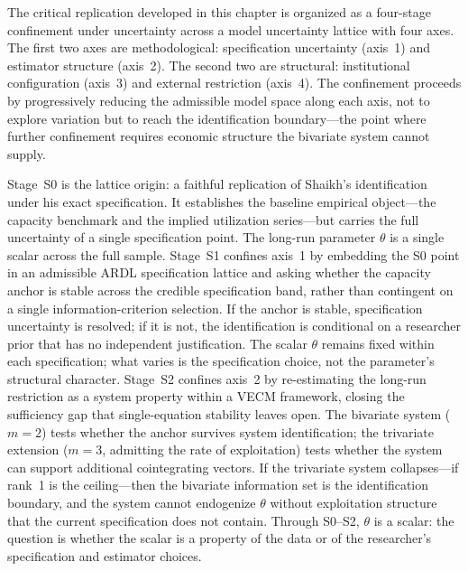 \documentclass[11pt,a4paper]{article}
\begin{document}
The critical replication developed in this chapter is organized as a four-stage confinement under uncertainty across a model uncertainty lattice with four axes. The first two axes are methodological: specification uncertainty (axis~1) and estimator structure (axis~2). The second two are structural: institutional configuration (axis~3) and external restriction (axis~4). The confinement proceeds by progressively reducing the admissible model space along each axis, not to explore variation but to reach the identification boundary---the point where further confinement requires economic structure the bivariate system cannot supply.

Stage~S0 is the lattice origin: a faithful replication of Shaikh's identification under his exact specification. It establishes the baseline empirical object---the capacity benchmark and the implied utilization series---but carries the full uncertainty of a single specification point. The long-run parameter $\theta$ is a single scalar across the full sample. Stage~S1 confines axis~1 by embedding the S0 point in an admissible ARDL specification lattice and asking whether the capacity anchor is stable across the credible specification band, rather than contingent on a single information-criterion selection. If the anchor is stable, specification uncertainty is resolved; if it is not, the identification is conditional on a researcher prior that has no independent justification. The scalar $\theta$ remains fixed within each specification; what varies is the specification choice, not the parameter's structural character. Stage~S2 confines axis~2 by re-estimating the long-run restriction as a system property within a VECM framework, closing the sufficiency gap that single-equation stability leaves open. The bivariate system ($m = 2$) tests whether the anchor survives system identification; the trivariate extension ($m = 3$, admitting the rate of exploitation) tests whether the system can support additional cointegrating vectors. If the trivariate system collapses---if rank~1 is the ceiling---then the bivariate information set is the identification boundary, and the system cannot endogenize $\theta$ without exploitation structure that the current specification does not contain. Through S0--S2, $\theta$ is a scalar: the question is whether the scalar is a property of the data or of the researcher's specification and estimator choices.
\end{document}
